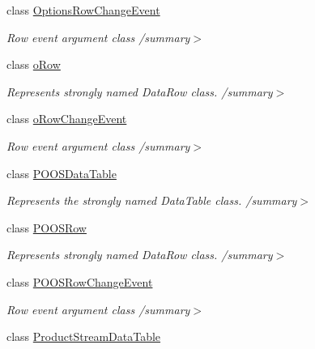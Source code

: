 \begin{DoxyCompactItemize}
class \hyperlink{class_env_int_1_1_win32_1_1_field_tech_1_1_manager_1_1_data_sets_1_1_guide_ware_mobile_data_set_1_1_options_row_change_event}{Options\+Row\+Change\+Event}
\begin{DoxyCompactList}\small\item\em Row event argument class /summary$>$ \end{DoxyCompactList}\item 
class \hyperlink{class_env_int_1_1_win32_1_1_field_tech_1_1_manager_1_1_data_sets_1_1_guide_ware_mobile_data_set_1_1o_row}{o\+Row}
\begin{DoxyCompactList}\small\item\em Represents strongly named Data\+Row class. /summary$>$ \end{DoxyCompactList}\item 
class \hyperlink{class_env_int_1_1_win32_1_1_field_tech_1_1_manager_1_1_data_sets_1_1_guide_ware_mobile_data_set_1_1o_row_change_event}{o\+Row\+Change\+Event}
\begin{DoxyCompactList}\small\item\em Row event argument class /summary$>$ \end{DoxyCompactList}\item 
class \hyperlink{class_env_int_1_1_win32_1_1_field_tech_1_1_manager_1_1_data_sets_1_1_guide_ware_mobile_data_set_1_1_p_o_o_s_data_table}{P\+O\+O\+S\+Data\+Table}
\begin{DoxyCompactList}\small\item\em Represents the strongly named Data\+Table class. /summary$>$ \end{DoxyCompactList}\item 
class \hyperlink{class_env_int_1_1_win32_1_1_field_tech_1_1_manager_1_1_data_sets_1_1_guide_ware_mobile_data_set_1_1_p_o_o_s_row}{P\+O\+O\+S\+Row}
\begin{DoxyCompactList}\small\item\em Represents strongly named Data\+Row class. /summary$>$ \end{DoxyCompactList}\item 
class \hyperlink{class_env_int_1_1_win32_1_1_field_tech_1_1_manager_1_1_data_sets_1_1_guide_ware_mobile_data_set_1_1_p_o_o_s_row_change_event}{P\+O\+O\+S\+Row\+Change\+Event}
\begin{DoxyCompactList}\small\item\em Row event argument class /summary$>$ \end{DoxyCompactList}\item 
class \hyperlink{class_env_int_1_1_win32_1_1_field_tech_1_1_manager_1_1_data_sets_1_1_guide_ware_mobile_data_set_1_1_product_stream_data_table}{Product\+Stream\+Data\+Table}

\end{DoxyCompactItemize}
